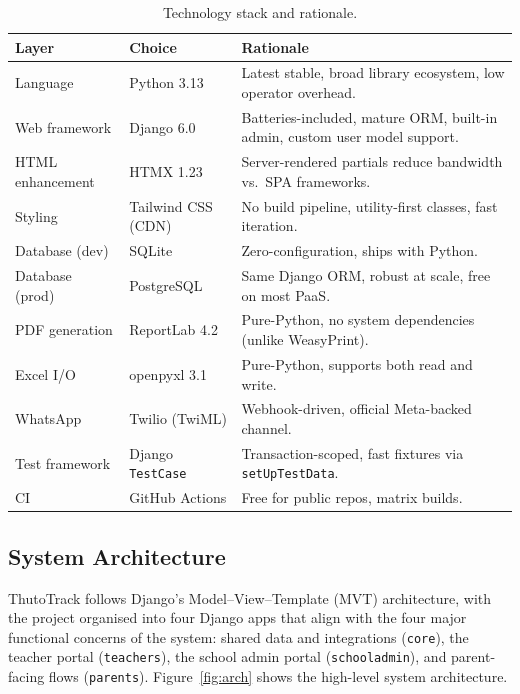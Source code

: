 \documentclass[11pt,a4paper]{article}
\begin{document}
\begin{table}[h]
\centering
\caption{Technology stack and rationale.}
\label{tab:stack}
\renewcommand{\arraystretch}{1.25}
\begin{tabular}{p{3.5cm} p{2.5cm} p{8.5cm}}
\toprule
\textbf{Layer} & \textbf{Choice} & \textbf{Rationale} \\
\midrule
Language          & Python 3.13          & Latest stable, broad library ecosystem, low operator overhead. \\
Web framework     & Django 6.0           & Batteries-included, mature ORM, built-in admin, custom user model support. \\
HTML enhancement  & HTMX 1.23            & Server-rendered partials reduce bandwidth vs.\ SPA frameworks. \\
Styling           & Tailwind CSS (CDN)   & No build pipeline, utility-first classes, fast iteration. \\
Database (dev)    & SQLite               & Zero-configuration, ships with Python. \\
Database (prod)   & PostgreSQL           & Same Django ORM, robust at scale, free on most PaaS. \\
PDF generation    & ReportLab 4.2        & Pure-Python, no system dependencies (unlike WeasyPrint). \\
Excel I/O         & openpyxl 3.1         & Pure-Python, supports both read and write. \\
WhatsApp          & Twilio (TwiML)       & Webhook-driven, official Meta-backed channel. \\
Test framework    & Django \texttt{TestCase} & Transaction-scoped, fast fixtures via \texttt{setUpTestData}. \\
CI                & GitHub Actions       & Free for public repos, matrix builds. \\
\bottomrule
\end{tabular}
\end{table}

\subsection{System Architecture}

ThutoTrack follows Django's Model--View--Template (MVT) architecture, with the
project organised into four Django apps that align with the four major
functional concerns of the system: shared data and integrations (\texttt{core}),
the teacher portal (\texttt{teachers}), the school admin portal
(\texttt{schooladmin}), and parent-facing flows (\texttt{parents}).
Figure~\ref{fig:arch} shows the high-level system architecture.
\end{document}
